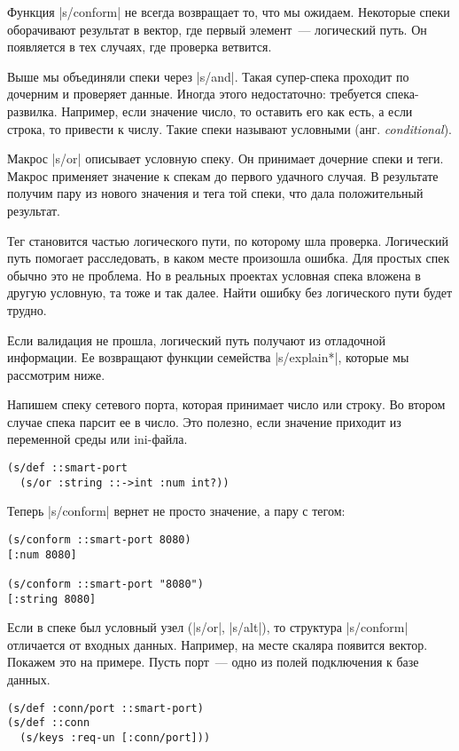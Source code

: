 Функция \spverb|s/conform| не всегда возвращает то, что мы ожидаем. Некоторые
спеки оборачивают результат в вектор, где первый элемент~--- логический путь. Он
появляется в тех случаях, где проверка ветвится.

Выше мы объединяли спеки через \spverb|s/and|. Такая супер-спека проходит по
дочерним и проверяет данные. Иногда этого недостаточно: требуется
спека-развилка. Например, если значение число, то оставить его как есть, а если
строка, то привести к числу. Такие спеки называют условными (анг. \emph{conditional}).

Макрос \spverb|s/or| описывает условную спеку. Он принимает дочерние спеки и
теги. Макрос применяет значение к спекам до первого удачного случая. В
результате получим пару из нового значения и тега той спеки, что дала
положительный результат.

Тег становится частью логического пути, по которому шла проверка. Логический
путь помогает расследовать, в каком месте произошла ошибка. Для простых спек
обычно это не проблема. Но в реальных проектах условная спека вложена в другую
условную, та тоже и так далее. Найти ошибку без логического пути будет трудно.

Если валидация не прошла, логический путь получают из отладочной информации. Ее
возвращают функции семейства \spverb|s/explain*|, которые мы рассмотрим ниже.

Напишем спеку сетевого порта, которая принимает число или строку. Во втором
случае спека парсит ее в число. Это полезно, если значение приходит из
переменной среды или ini-файла.

\begin{verbatim}
(s/def ::smart-port
  (s/or :string ::->int :num int?))
\end{verbatim}

Теперь \spverb|s/conform| вернет не просто значение, а пару с тегом:

\begin{verbatim}
(s/conform ::smart-port 8080)
[:num 8080]

(s/conform ::smart-port "8080")
[:string 8080]
\end{verbatim}

Если в спеке был условный узел (\spverb|s/or|, \spverb|s/alt|), то структура
\spverb|s/conform| отличается от входных данных. Например, на месте скаляра
появится вектор. Покажем это на примере. Пусть порт~--- одно из полей
подключения к базе данных.

\begin{verbatim}
(s/def :conn/port ::smart-port)
(s/def ::conn
  (s/keys :req-un [:conn/port]))
\end{verbatim}

